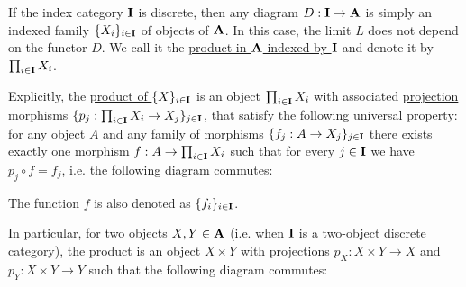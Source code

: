 \begin{definition}\label{def:categorical_product}\cite[definition 5.1.1, 5.1.7]{Leinster2014}
  If the index category $\operatorname{\mathbf{I}}$ is discrete, then any diagram $D: \operatorname{\mathbf{I}} \to \operatorname{\mathbf{A}}$ is simply an indexed family $\{ X_i \}_{i \in \operatorname{\mathbf{I}}}$ of objects of $\operatorname{\mathbf{A}}$. In this case, the limit $L$ does not depend on the functor $D$. We call it the \ul{product in $\operatorname{\mathbf{A}}$ indexed by $\operatorname{\mathbf{I}}$} and denote it by $\prod_{i \in \operatorname{\mathbf{I}}} X_i$.

  Explicitly, the \ul{product of $\{ X \}_{i \in \operatorname{\mathbf{I}}}$} is an object $\prod_{i \in \operatorname{\mathbf{I}}} X_i$ with associated \ul{projection morphisms} $\{ p_j: \prod_{i \in \operatorname{\mathbf{I}}} X_i \to X_j \}_{j \in \operatorname{\mathbf{I}}}$, that satisfy the following universal property: for any object $A$ and any family of morphisms $\{ f_j: A \to {X_j} \}_{j \in \operatorname{\mathbf{I}}}$ there exists exactly one morphism $f: A \to \prod_{i \in \operatorname{\mathbf{I}}} X_i$ such that for every $j \in \operatorname{\mathbf{I}}$ we have $p_j \circ f = f_j$, i.e. the following diagram commutes:
  \begin{Center}
  \end{Center}

  The function $f$ is also denoted as $\{ f_i \}_{i \in \operatorname{\mathbf{I}}}$.

  In particular, for two objects $X, Y \in \operatorname{\mathbf{A}}$ (i.e. when $\operatorname{\mathbf{I}}$ is a two-object discrete category), the product is an object $X \times Y$ with projections $p_X: X \times Y \to X$ and $p_Y: X \times Y \to Y$ such that the following diagram commutes:
  \begin{Center}
  \end{Center}
\end{definition}

